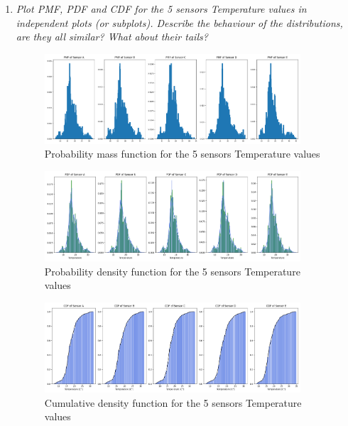 \documentclass[a4paper,12pt]{article} %
\begin{document}
\begin{enumerate}
\item{\it Plot PMF, PDF and CDF for the 5 sensors Temperature values in independent plots (or subplots). Describe the behaviour of the distributions, are they all similar? What about their tails?}
\begin{figure}[H] %
    \centering %
    \includegraphics[width=0.9\textwidth]{plot_PMF_T.png} 
    \caption{Probability mass function for the 5 sensors Temperature values} %
  \end{figure}
  \begin{figure}[H] %
    \centering %
    \includegraphics[width=0.9\textwidth]{plot_PDF_T.png} 
    \caption{Probability density function for the 5 sensors Temperature values} %
  \end{figure}
  \begin{figure}[H] %
    \centering %
    \includegraphics[width=0.9\textwidth]{plot_CDF_T.png} 
    \caption{Cumulative density function for the 5 sensors Temperature values} %
  \end{figure}

\end{enumerate}
\end{document}
